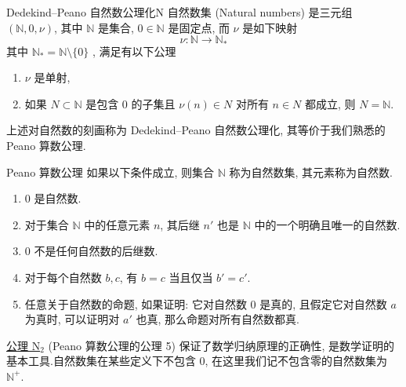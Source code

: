 \documentclass[cn,toc=twocol]{elegantbook}
\newcommand{\ITEMS}{\begin{enumerate}}
\newcommand{\ITEME}{\end{enumerate}}
\newcommand{\N}{\mathbb{N}}
\begin{document}
\begin{axiom}{Dedekind–Peano 自然数公理化}{N}
自然数集 (Natural numbers) 是三元组 $(\N,0,\nu)$, 其中 $\N$ 是集合, $0 \in \N$ 是固定点, 而 $\nu$ 是如下映射
\[
	\nu: \N \rightarrow \N_*
\]
其中 $\N_* = \N\setminus\{0\}$ , 满足有以下公理
\ITEMS
	\item[{\boldmath $N_0$}] $\nu$ 是单射,
	\item[{\boldmath $N_1$}] 如果 $N \subset \N$ 是包含 $0$ 的子集且 $\nu (n) \in N$ 对所有 $n \in N$ 都成立, 则 $N = \N$.
\ITEME
\end{axiom}

上述对自然数的刻画称为 Dedekind–Peano 自然数公理化, 其等价于我们熟悉的 Peano 算数公理.

\begin{axiom}{Peano 算数公理}
如果以下条件成立, 则集合 $\N$ 称为自然数集, 其元素称为自然数.
\ITEMS
	\item $0$ 是自然数.
	\item 对于集合 $\N$ 中的任意元素 $n$, 其后继 $n'$ 也是 $\N$ 中的一个明确且唯一的自然数.
	\item $0$ 不是任何自然数的后继数.
	\item 对于每个自然数 $b, c$, 有 $b=c$ 当且仅当 $b' = c'$.
	\item 任意关于自然数的命题, 如果证明: 它对自然数 $0$ 是真的, 且假定它对自然数 $a$ 为真时, 可以证明对 $a'$ 也真, 那么命题对所有自然数都真.
\ITEME
\end{axiom}

\begin{remark}
	\hyperref[ax:N]{公理 N$_2$} (Peano 算数公理的公理 5) 保证了数学归纳原理的正确性, 是数学证明的基本工具.自然数集在某些定义下不包含 $0$, 在这里我们记不包含零的自然数集为 $\N^+$.
\end{remark}
\end{document}
